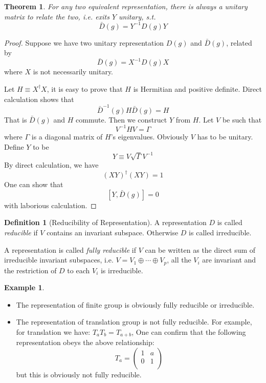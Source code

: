 \documentclass{article}
\numberwithin{equation}{subsection} %
\newtheorem{thm}{Theorem}[section]
\theoremstyle{definition}
\newtheorem{defi}{Definition}[section]
\newtheorem{ex}{Example}[section]
\begin{document}
\begin{thm}
    For any two equivalent representation, there is always a unitary
    matrix to relate the two, i.e. exits $Y$ unitary, s.t.
    $$ \bar{D}(g) = Y^{-1} D(g) Y$$
\end{thm}
\begin{proof}
    Suppose we have two unitary representation $D(g)$ and
    $\bar{D}(g)$, related by
    $$ \bar{D}(g) = X^{-1} D(g) X$$
    where $X$ is not necessarily unitary.

    Let $H\equiv X^\dagger X$, it is easy to prove that $H$ is
    Hermitian and positive definite. Direct calculation shows that
    $$ \bar{D}^{-1}(g) H \bar{D}(g) = H$$
    That is $\bar{D}(g)$ and $H$ commute.
    Then we construct $Y$ from $H$. Let $V$ be such that
    \begin{equation}
        V^{-1} H V = \Gamma
    \end{equation}
    where $\Gamma$ is a diagonal matrix of $H$'s eigenvalues.
    Obviously $V$ has to be unitary. Define $Y$ to be
    \begin{equation}
        Y\equiv V \sqrt{\Gamma} V^{-1}
    \end{equation}
    By direct calculation, we have
    $$ (XY)^\dagger (XY) = 1$$
    One can show that
    $$[ Y, \bar{D}(g)] = 0$$
    with laborious calculation. %
\end{proof}

\begin{defi}[Reducibility of Representation]
    A representation $D$ is called \textit{reducible} if $V$ contains an
    invariant subspace. Otherwise $D$ is called irreducible.

    A representation is called \textit{fully reducible} if $V$ can be
    written as the direct sum of irreducible invariant subspaces, i.e.
    $V=V_1\oplus \cdots \oplus V_p$, all the $V_i$ are invariant and the
    restriction of $D$ to each $V_i$ is irreducible.
\end{defi}

\begin{ex}$ $

    \begin{itemize}
        \item The representation of finite group is obviously fully
            reducible or irreducible.
        \item The representation of translation group is not fully
            reducible. For example, for translation we have:
            $T_a T_b = T_{a+b}$,
            One can confirm that the following representation obeys
            the above relationship:
            $$T_a = \left( \begin{array}{cc}
                 1 & a \\
                 0 & 1 \\
            \end{array} \right)$$
            but this is obviously not fully reducible.
    \end{itemize}
\end{ex}
\end{document}
